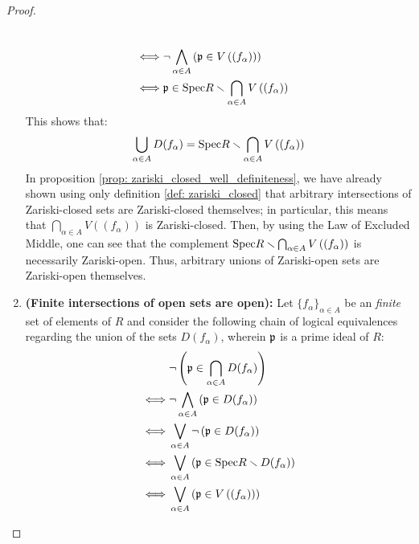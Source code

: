 \begin{proof}
\begin{enumerate}
$$\begin{aligned}
                                        \\
                                        \iff & \neg \bigwedge_{\alpha \in A} \left(\p \in V\left((f_{\alpha})\right)\right)
                                        \\
                                        \iff & \p \in \Spec R \setminus \bigcap_{\alpha \in A} V\left((f_{\alpha})\right)
                                    \end{aligned}
                                $$
                            This shows that:
                                $$\bigcup_{\alpha \in A} D(f_{\alpha}) = \Spec R \setminus \bigcap_{\alpha \in A} V\left((f_{\alpha})\right)$$
                            In proposition \ref{prop: zariski_closed_well_definiteness}, we have already shown using only definition \ref{def: zariski_closed} that arbitrary intersections of Zariski-closed sets are Zariski-closed themselves; in particular, this means that $\bigcap_{\alpha \in A} V\left((f_{\alpha})\right)$ is Zariski-closed. Then, by using the Law of Excluded Middle, one can see that the complement $\Spec R \setminus \bigcap_{\alpha \in A} V\left((f_{\alpha})\right)$ is necessarily Zariski-open. Thus, arbitrary unions of Zariski-open sets are Zariski-open themselves.
                            \item \textbf{(Finite intersections of open sets are open):} Let $\{f_{\alpha}\}_{\alpha \in A}$ be an \textit{finite} set of elements of $R$ and consider the following chain of logical equivalences regarding the union of the sets $D(f_{\alpha})$, wherein $\p$ is a prime ideal of $R$:
                                $$
                                    \begin{aligned}
                                        & \neg \left(\p \in \bigcap_{\alpha \in A} D(f_{\alpha})\right)
                                        \\
                                        \iff & \neg \bigwedge_{\alpha \in A} \left(\p \in D(f_{\alpha})\right)
                                        \\
                                        \iff & \bigvee_{\alpha \in A} \neg \left(\p \in D(f_{\alpha})\right)
                                        \\
                                        \iff & \bigvee_{\alpha \in A} \left(\p \in \Spec R \setminus D(f_{\alpha})\right)
                                        \\
                                        \iff & \bigvee_{\alpha \in A} \left(\p \in V\left((f_{\alpha})\right)\right)

\end{aligned}$$
\end{enumerate}
\end{proof}
